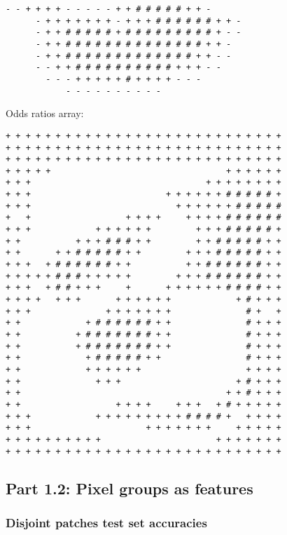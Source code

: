 \begin{multicols*}{2}
\begin{Verbatim}[samepage=true]
      - - + + + + - - - - - + + # # # # # + + -         
      - + + + + + + + - + + + # # # # # # + + -         
      - + + # # # # # + # # # # # # # # # + - -         
      - + + # # # # # # # # # # # # # # + + -           
      - + + # # # # # # # # # # # # # + + - -           
      - - + + # # # # # # # # # # + + + - -             
        - - - + + + + + # + + + + - - -                 
            - - - - - - - - - -                         
\end{Verbatim}
\newpage
Odds ratios array:
\begin{Verbatim}[samepage=true]
+ + + + + + + + + + + + + + + + + + + + + + + + + + + + 
+ + + + + + + + + + + + + + + + + + + + + + + + + + + + 
+ + + + + + + + + + + + + + + + + + + + + + + + + + + + 
+ + + + +                                   + + + + + + 
+ + +                                   + + + + + + + + 
+ + +                           + + + + + + # # # # # + 
+ + +                             + + + + + + # # # # # 
+   +                   + + + +     + + + + # # # # # # 
+ + +             + + + + + +         + + + # # # # # + 
+ +           + + + # # # + +         + + # # # # # + + 
+ +       + + # # # # # + +         + + + # # # # # + + 
+ + +   + # # # # # # + +           + + # # # # # # + + 
+ + + + + # # # + + + + +         + + + # # # # # # + + 
+ + +   + # # + + +     +       + + + + + + # # # # + + 
+ + + +   + + +       + + + + + +             + # + + + 
+ + +               + + + + + + +               # +   + 
+ +             + # # # # # # + +               # + + + 
+ +           + # # # # # # # + +               # + + + 
+ +           + # # # # # # # + +               # + + + 
+ +             + # # # # # + +                 # + + + 
+ +             + + + + + +                     + + + + 
+ +               + + +                       + # + + + 
+ +                                         + + # + + + 
+ +                   + + + +     + + +   + # + + + + + 
+ + +             + + + + + + + + + # # # # +   + + + + 
+ + +                       + + + + + + +     + + + + + 
+ + + + + + + + + +                       + + + + + + + 
+ + + + + + + + + + + + + + + + + + + + + + + + + + + + 
\end{Verbatim}
\end{multicols*}


\subsection{Part 1.2: Pixel groups as features}
\subsubsection{Disjoint patches test set accuracies}
